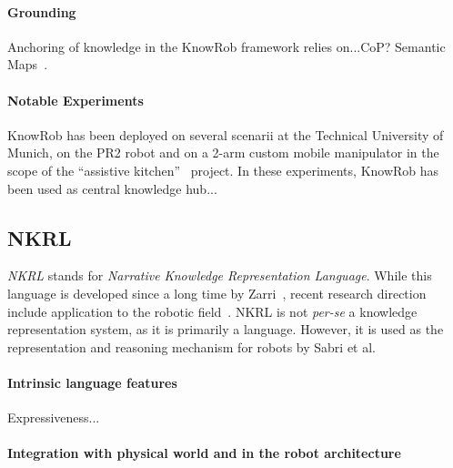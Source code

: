 \paragraph{Grounding} Anchoring of knowledge in the {\sc KnowRob} framework
relies on...CoP? Semantic Maps~\cite{Blodow2011}.



\paragraph{Notable Experiments} {\sc KnowRob} has been deployed on several
scenarii at the Technical University of Munich, on the PR2 robot and on a 2-arm
custom mobile manipulator in the scope of the ``assistive
kitchen''~\cite{Beetz2008} project. In these experiments, {\sc KnowRob} has
been used as central knowledge hub...

\subsection{NKRL}
\label{sect|nkrl}

\emph{NKRL} stands for \emph{Narrative Knowledge Representation Language}.
While this language is developed since a long time by Zarri~\cite{Zarri1997,
Zarri2008}, recent research direction include application to the robotic
field~\cite{Sabri2011}. NKRL is not {\it per-se} a knowledge representation
system, as it is primarily a language. However, it is used as the
representation and reasoning mechanism for robots by Sabri et al.


\paragraph{Intrinsic language features}
\label{sect|nkrl-intrinsic-features}

Expressiveness...

\paragraph{Integration with physical world and in the robot architecture}
\label{sect|nkrl-integration}

